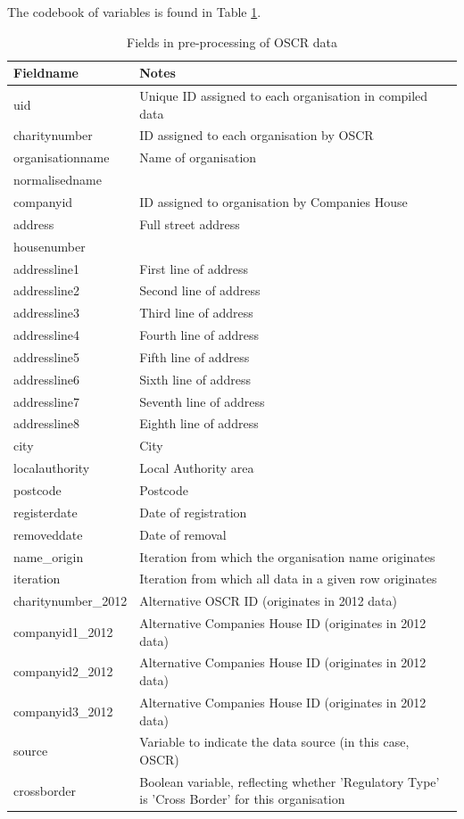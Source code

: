 \documentclass{article}
\begin{document}
The codebook of variables is found in Table \ref{tab:oscr_preprocess}.


\begin{table}[h]
  \centering
  \begin{tabularx}{\textwidth}{|l|X|}
    \hline
    Fieldname  &	Notes \\
    \hline \hline
uid & Unique ID assigned to each organisation in compiled data \\ \hline
charitynumber & ID assigned to each organisation by OSCR \\ \hline
organisationname & Name of organisation \\ \hline
normalisedname & \\ \hline
companyid & ID assigned to organisation by Companies House \\ \hline
address & Full street address \\ \hline
housenumber & \\ \hline
addressline1 & First line of address \\ \hline
addressline2 & Second line of address \\ \hline
addressline3 & Third line of address \\ \hline
addressline4 & Fourth line of address \\ \hline
addressline5 & Fifth line of address \\ \hline
addressline6 & Sixth line of address \\ \hline
addressline7 & Seventh line of address \\ \hline
addressline8 & Eighth line of address \\ \hline
city & City \\ \hline
localauthority & Local Authority area \\ \hline
postcode & Postcode \\ \hline
registerdate & Date of registration \\ \hline
removeddate & Date of removal \\ \hline
name\_origin & Iteration from which the organisation name originates \\ \hline
iteration & Iteration from which all data in a given row originates \\ \hline
charitynumber\_2012 & Alternative OSCR ID (originates in 2012 data) \\ \hline
companyid1\_2012 & Alternative Companies House ID (originates in 2012 data) \\ \hline
companyid2\_2012 & Alternative Companies House ID (originates in 2012 data) \\ \hline
companyid3\_2012 & Alternative Companies House ID (originates in 2012 data) \\ \hline
source & Variable to indicate the data source (in this case, OSCR) \\ \hline
crossborder & Boolean variable, reflecting whether 'Regulatory Type' is 'Cross Border' for this organisation \\ \hline
\end{tabularx}
\caption{Fields in pre-processing of OSCR data}
\label{tab:oscr_preprocess}
\end{table}
\end{document}
